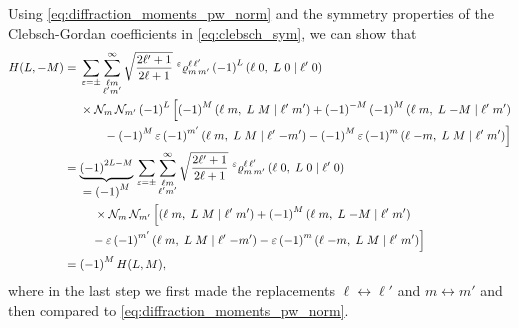 Using \cref{eq:diffraction_moments_pw_norm} and the symmetry
properties of the Clebsch-Gordan coefficients in
\cref{eq:clebsch_sym}, we can show that
\begin{align}
  H(L, -M)
  ={}& \begin{multlined}[t][0.8\textwidth]
    \sum_{\refl = \pm} \sum_{\substack{\ell m \\ \ell' m'}}^\infty
    \sqrt{\frac{2 \ell' + 1}{2 \ell + 1}}\,
    \prescript{\refl}{}{\varrho}^{\ell\, \ell'}_{m\, m'}\, {(-1)}^L\, \clebsch{\ell}{0}{L}{0}{\ell'}{0} \\
    \times \mathcal{N}_m\, \mathcal{N}_{m'}\, {(-1)}^L\, \Big[
      {(-1)}^M\, \clebsch{\ell}{m}{L}{M}{\ell'}{m'}
      + {(-1)}^{-M}\, {(-1)}^M\, \clebsch{\ell}{m}{L}{-M}{\ell'}{m'} \\
      - {(-1)}^M\, \refl\, {(-1)}^{m'}\, \clebsch{\ell}{m}{L}{M}{\ell'}{-m'}
      - {(-1)}^M\, \refl\, {(-1)}^m\, \clebsch{\ell}{-m}{L}{M}{\ell'}{m'} \Big]
  \end{multlined} \notag
  \\
  ={}& \begin{multlined}[t][0.8\textwidth]
    \dUnderbrace{{(-1)}^{2 L - M}}{= {(-1)}^M}\, \sum_{\refl = \pm} \sum_{\substack{\ell m \\ \ell' m'}}^\infty
    \sqrt{\frac{2 \ell' + 1}{2 \ell + 1}}\,
    \prescript{\refl}{}{\varrho}^{\ell\, \ell'}_{m\, m'}\, \clebsch{\ell}{0}{L}{0}{\ell'}{0} \\
    \times \mathcal{N}_m\, \mathcal{N}_{m'}\, \Big[
      \clebsch{\ell}{m}{L}{M}{\ell'}{m'}
      + {(-1)}^{M}\, \clebsch{\ell}{m}{L}{-M}{\ell'}{m'} \\
      - \refl\, {(-1)}^{m'}\, \clebsch{\ell}{m}{L}{M}{\ell'}{-m'}
      - \refl\, {(-1)}^m\, \clebsch{\ell}{-m}{L}{M}{\ell'}{m'} \Big]
  \end{multlined} \notag
  \\
  \label{eq:diffraction_moment_sym_2}
  ={}& {(-1)}^M\, H(L, M),
\end{align}
where in the last step we first made the replacements $\ell
\leftrightarrow \ell'$ and $m \leftrightarrow m'$ and then compared to
\cref{eq:diffraction_moments_pw_norm}.

